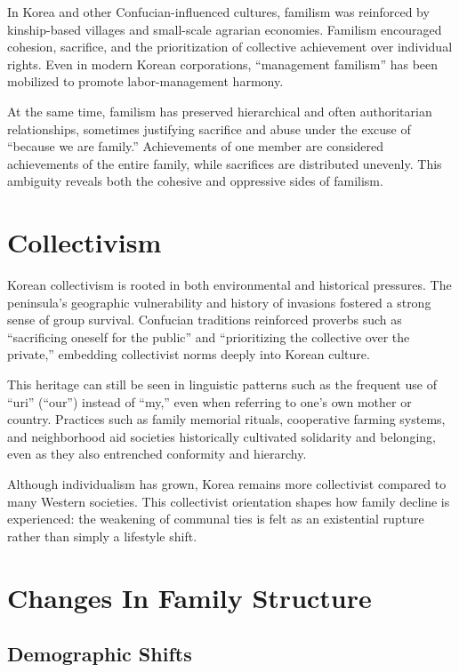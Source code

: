 In Korea and other Confucian-influenced cultures, familism was reinforced by kinship-based villages and small-scale agrarian economies. Familism encouraged cohesion, sacrifice, and the prioritization of collective achievement over individual rights. Even in modern Korean corporations, “management familism” has been mobilized to promote labor-management harmony.  

At the same time, familism has preserved hierarchical and often authoritarian relationships, sometimes justifying sacrifice and abuse under the excuse of “because we are family.” Achievements of one member are considered achievements of the entire family, while sacrifices are distributed unevenly. This ambiguity reveals both the cohesive and oppressive sides of familism.  

\section{Collectivism}

Korean collectivism is rooted in both environmental and historical pressures. The peninsula’s geographic vulnerability and history of invasions fostered a strong sense of group survival. Confucian traditions reinforced proverbs such as “sacrificing oneself for the public” and “prioritizing the collective over the private,” embedding collectivist norms deeply into Korean culture.  

This heritage can still be seen in linguistic patterns such as the frequent use of “uri” (“our”) instead of “my,” even when referring to one’s own mother or country. Practices such as family memorial rituals, cooperative farming systems, and neighborhood aid societies historically cultivated solidarity and belonging, even as they also entrenched conformity and hierarchy.  

Although individualism has grown, Korea remains more collectivist compared to many Western societies. This collectivist orientation shapes how family decline is experienced: the weakening of communal ties is felt as an existential rupture rather than simply a lifestyle shift.  

\section{Changes In Family Structure}

\subsection{Demographic Shifts}

